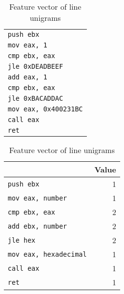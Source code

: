 \begin{table}[!htb]
\begin{minipage}{.5\linewidth}
	\centering
	
	\caption{Assembly code of a function}
	\label{tab:function_f}
	
	\medskip
	
	\begin{tabular}{ l } 
		\toprule
		\texttt{push ebx} \\
		\texttt{mov eax, 1}\\
		\texttt{cmp ebx, eax}\\
		\texttt{jle 0xDEADBEEF}\\
		\texttt{add eax, 1}\\
		\texttt{cmp ebx, eax}\\
		\texttt{jle 0xBACADDAC}\\
		\texttt{mov eax, 0x400231BC}\\
		\texttt{call eax}\\
		\texttt{ret}\\
	
		
		\bottomrule
	\end{tabular}
\end{minipage}\hfill
\begin{minipage}{.5\linewidth}
	\centering
	
	\caption{Feature vector of line unigrams}
	\label{tab:line_unigrams}
	
	\medskip
	
	\begin{tabular}{  lr } 
		\toprule
		\makecell{ Feature }  &  Value \\   
		
		\midrule 
		\texttt{push ebx} & 1         \\
		\texttt{mov eax, number} & 1                  \\ 
		\texttt{cmp ebx, eax }   & 2                  \\ 
		\texttt{add ebx, number}     & 2                  \\ 
		\texttt{jle hex }       & 2                  \\
		\texttt{mov eax, hexadecimal} & 1\\ 
		\texttt{call eax}       & 1                  \\
		\texttt{ret} & 1\\
		\bottomrule
	\end{tabular}
\end{minipage}
\end{table}


